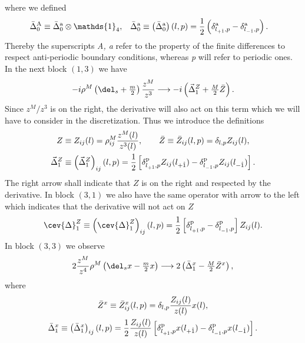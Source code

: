 %
%
where we defined
%
%
\begin{align}
\bar{\Delta}^{\rm A}_{0} &\equiv \bar{\Delta}^{\rm a}_{0} \otimes \mathds{1}_{4}, &
\bar{\Delta}^{\rm a}_{0} &\equiv \left(\bar{\Delta}^{\rm a}_{0}\right)(l,p) = \frac{1}{2}\left( \delta_{l_{+\hat{1}},p}^{\rm a}-\delta_{l_{-\hat{1}},p}^{\rm a}\right).
\end{align}
%
%
Thereby the superscripts \textit{A, a} refer to the property of the finite differences to respect anti-periodic boundary conditions, whereas \textit{p} will refer to periodic ones. In the next block $(1,3)$ we have
%
%
\begin{equation}
-i \rho^{M}\left(\del_{s} +\tfrac{m}{2}\right) \frac{z^{M}}{z^{3}} \longrightarrow -i \left( \vec{\Delta}_{1}^{Z} +\tfrac{M}{2} \bar{Z}\right).
\end{equation}
%
%
Since $z^{M}/z^{3}$ is on the right, the derivative will also act on this term which we will have to consider in the discretization. Thus we introduce the definitions
%
%
\begin{gather}
Z \equiv Z_{ij}(l) = \rho_{ij}^{M} \frac{z^{M}(l)}{z^{3}(l)}, \qquad \bar{Z} \equiv \bar{Z}_{ij}(l,p) = \delta_{l,p} Z_{ij}(l), \\
\vec{\Delta}_{1}^{Z} \equiv \left(\vec{\Delta}_{1}^{Z}\right)_{ij}(l,p) = \frac{1}{2} \left[ \delta_{l_{+\hat{1}},p}^{\rm p}Z_{ij}(l_{+\hat{1}})-\delta_{l_{-\hat{1}},p}^{\rm p} Z_{ij}(l_{-\hat{1}})\right].
\end{gather}
%
%
The right arrow shall indicate that $Z$ is on the right and respected by the derivative. In block $(3,1)$ we also have the same operator with arrow to the left which indicates that the derivative will not act on $Z$
%
%
\begin{equation}
\cev{\Delta}_{1}^{Z} \equiv \left(\cev{\Delta}_{1}^{Z}\right)_{ij}(l,p) = \frac{1}{2} \left[ \delta_{l_{+\hat{1}},p}^{\rm p}-\delta_{l_{-\hat{1}},p}^{\rm p}\right] Z_{ij}(l) .
\end{equation}
%
%
In block $(3,3)$ we observe
%
%
\begin{equation}
2\frac{z^{M}}{z^{4}}\rho^{M}\left(\del_{s}x-\tfrac{m}{2}x\right) \longrightarrow  2\left( \bar{\Delta}_{1}^{x}-\tfrac{M}{2}\bar{Z}^{x} \right),
\end{equation}
%
%
where
%
%
\begin{gather}
\bar{Z}^{x} \equiv \bar{Z}^{x}_{ij}(l,p) = \delta_{l,p}\frac{Z_{ij}(l)}{z(l)}x(l), \\
\bar{\Delta}_{1}^{x} \equiv \left(\bar{\Delta}_{1}^{x}\right)_{ij}(l,p) = \frac{1}{2} \frac{Z_{ij}(l)}{z(l)} \left[ \delta_{l_{+\hat{1}},p}^{\rm p}x(l_{+\hat{1}})-\delta_{l_{-\hat{1}},p}^{\rm p} x(l_{-\hat{1}})\right].
\end{gather}